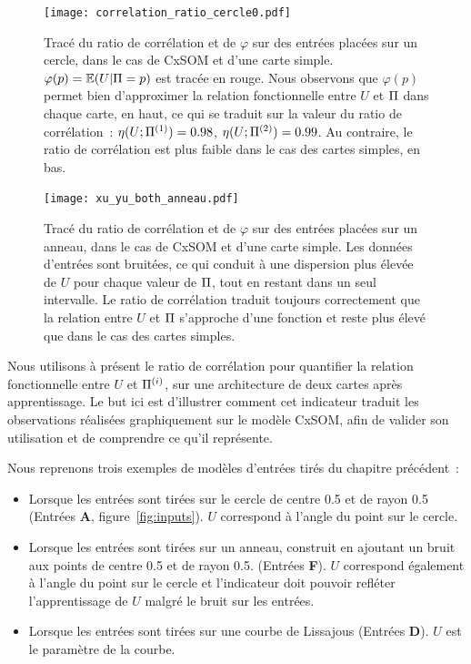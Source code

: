 \documentclass[../main]{subfiles}
\begin{document}
\begin{figure}
    \centering\texttt{[image: correlation\_ratio\_cercle0.pdf]}
    \caption{Tracé du ratio de corrélation et de $\varphi$ sur des entrées placées sur un cercle, dans le cas de CxSOM et d'une carte simple. $\varphi(p) = \mathbb{E}(U|\Pi =p)$ est tracée en rouge.
    Nous observons que $\varphi(p)$ permet bien d'approximer la relation fonctionnelle entre $U$ et $\Pi$ dans chaque carte, en haut, ce qui se traduit sur la valeur du ratio de corrélation~: $\eta(U;\Pi^{({1})}) = 0.98$, $\eta(U;\Pi^{({2})}) = 0.99$. Au contraire, le ratio de corrélation est plus faible dans le cas des cartes simples, en bas.
     \label{fig:cr_xp}}
\end{figure}

\begin{figure}
   \centering \texttt{[image: xu\_yu\_both\_anneau.pdf]}
    \caption{Tracé du ratio de corrélation et de $\varphi$ sur des entrées placées sur un anneau, dans le cas de CxSOM et d'une carte simple. Les données d'entrées sont bruitées, ce qui conduit à une dispersion plus élevée de $U$ pour chaque valeur de $\Pi$, tout en restant dans un seul intervalle. Le ratio de corrélation traduit toujours correctement que la relation entre $U$ et $\Pi$ s'approche d'une fonction et reste plus élevé que dans le cas des cartes simples. \label{fig:cr_bruit}}
\end{figure}

Nous utilisons à présent le ratio de corrélation pour quantifier la relation fonctionnelle entre $U$ et $\Pi^{({i})}$, sur une architecture de deux cartes après apprentissage. Le but ici est d'illustrer comment cet indicateur traduit les observations réalisées graphiquement sur le modèle CxSOM, afin de valider son utilisation et de comprendre ce qu'il représente.

Nous reprenons trois exemples de modèles d'entrées tirés du chapitre précédent~:
\begin{itemize}
    \item Lorsque les entrées sont tirées sur le cercle de centre 0.5 et de rayon 0.5 (Entrées \textbf{A}, figure~\ref{fig:inputs}). $U$ correspond à l'angle du point sur le cercle.
    \item Lorsque les entrées sont tirées sur un anneau, construit en ajoutant un bruit aux points de centre 0.5 et de rayon 0.5. (Entrées \textbf{F}). $U$ correspond également à l'angle du point sur le cercle et l'indicateur doit pouvoir refléter l'apprentissage de $U$ malgré le bruit sur les entrées.
    \item Lorsque les entrées sont tirées sur une courbe de Lissajous (Entrées \textbf{D}). $U$ est le paramètre de la courbe.
\end{itemize}
\end{document}
